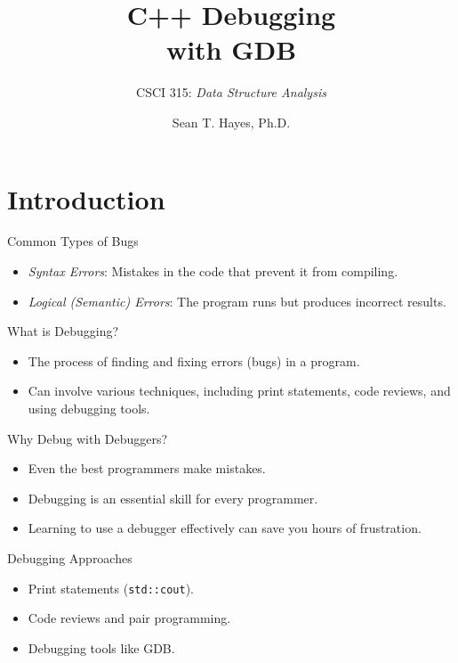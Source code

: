 \documentclass[14pt,aspectratio=1610]{beamer}
\title{\Huge{} C++ Debugging\\ with GDB}
\subtitle{CSCI 315: \textit{Data Structure Analysis}}
\author{Sean T. Hayes, Ph.D.}
\institute{Charleston Southern University}
\begin{document}
\begin{frame}
  \titlepage{}
\end{frame}

\section{Introduction}

\begin{frame}{Common Types of Bugs}
  \begin{itemize}\setlength\itemsep{0.5em}
    \item 
      \emph{Syntax Errors}: Mistakes in the code that prevent it from compiling.
    \item 
      \emph{Logical (Semantic) Errors}: The program runs but produces incorrect results.
  \end{itemize}
\end{frame}

\begin{frame}{What is Debugging?}
  \begin{itemize}\setlength\itemsep{0.5em}
    \item 
      The process of finding and fixing errors (bugs) in a program.
    \item 
      Can involve various techniques, including print statements, code reviews, and using debugging tools.
  \end{itemize}
\end{frame}

\begin{frame}{Why Debug with Debuggers?}
  \begin{itemize}\setlength\itemsep{0.5em}
    \item 
      Even the best programmers make mistakes.
    \item 
      Debugging is an essential skill for every programmer.
    \item 
      Learning to use a debugger effectively can save you hours of frustration.
  \end{itemize}
\end{frame}

\begin{frame}{Debugging Approaches}
  \begin{itemize}\setlength\itemsep{0.5em}
    \item 
      Print statements (\lstinline{std::cout}).
    \item 
      Code reviews and pair programming.
    \item 
      Debugging tools like GDB\@.
  \end{itemize}
\end{frame}
\end{document}
